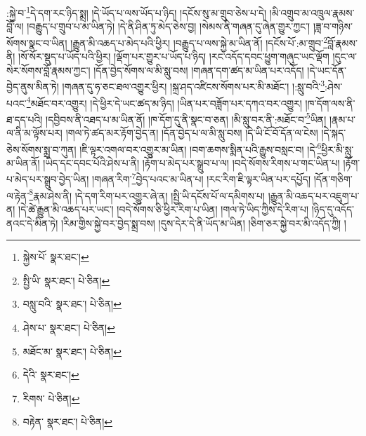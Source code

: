 :སྐྱེ་བ་\footnote{སྐྱེས་པོ་  སྣར་ཐང་། }དེ་དག་རང་ཉིད་སྨྲ། །དེ་ཡོད་པ་ལས་ཡོད་པ་ཉིད། །དངོས་སུ་མ་གྲུབ་ཅེས་པ་དེ། །མི་འགྲུབ་མ་འཁྲུལ་རྣམས་བློ་ལ། །བརྒྱུད་པ་གྲུབ་པ་མ་ཡིན་ཏེ། །དེ་ནི་ཤིན་ཏུ་མེད་ཅེས་བྱ། །སེམས་ནི་གཞན་དུ་ཞེན་གྱུར་ཀྱང་། །ཟླ་བ་གཉིས་སོགས་སྣང་བ་ཡིན། །རྒྱུན་མི་འཆད་པ་མེད་པའི་ཕྱིར། །བརྒྱུད་པ་ལས་སྐྱེ་མ་ཡིན་ནོ། །དངོས་པོ་:མ་གྲུབ་\footnote{སྤྱི་ཡི་  སྣར་ཐང་།  པེ་ཅིན། }བློ་རྣམས་ནི། །སོ་སོར་སྡུད་པ་ཡོད་པའི་ཕྱིར། །ལྡོག་པར་གྱུར་པ་ཡོད་པ་ཉིད། །རང་འདོད་དབང་ཕྱུག་གཞུང་ཡང་ལྡོག །དུང་ལ་སེར་སོགས་བློ་རྣམས་ཀྱང་། །དོན་བྱེད་སོགས་ལ་མི་སླུ་བས། །གཞན་དག་ཚད་མ་ཡིན་པར་འདོད། །དེ་ཡང་དོན་བྱེད་ནུས་མིན་ཏེ། །གཞན་དུ་ཧ་ཅང་ཐལ་འགྱུར་ཕྱིར། །སྐྲ་ཤད་འཛིངས་སོགས་པར་མི་མཐོང་། །:སླུ་བའི་\footnote{བསླུ་བའི་  སྣར་ཐང་།  པེ་ཅིན། }:ཤེས་པའང་\footnote{ཤེས་པ་  སྣར་ཐང་།  པེ་ཅིན། }མཐོང་བར་འགྱུར། །དེ་ཕྱིར་དེ་ཡང་ཚད་མ་ཉིད། །ཡིན་པར་བཟློག་པར་དཀའ་བར་འགྱུར། །ཁ་དོག་ལས་ནི་ཐ་དད་པའི། །དབྱིབས་ནི་འཐད་པ་མ་ཡིན་ནོ། །ཁ་དོག་དུ་ནི་སྣང་བ་ཅན། །མི་སླུ་བར་ནི་:མཐོང་བ་\footnote{མཐོང་མ་  སྣར་ཐང་།  པེ་ཅིན། }ཡིན། །རྣམ་པ་ལ་ནི་མ་ལྟོས་པར། །གལ་ཏེ་ཚད་མར་རྟོག་བྱེད་ན། །དོན་བྱེད་པ་ལ་མི་སླུ་བས། །དེ་ཡི་ངོ་བོ་དོན་ལ་ངེས། །དེ་སྐད་ཅེས་སོགས་སྨྲ་བ་ཀུན། །ཇི་ལྟར་འགལ་བར་འགྱུར་མ་ཡིན། །བག་ཆགས་སྨིན་པའི་རྒྱུས་བསླང་བ། །དེ་\footnote{དེའི་  སྣར་ཐང་། }ཕྱིར་མི་སླུ་མ་ཡིན་ནོ། །ཡིད་དང་དབང་པོའི་ཤེས་པ་ནི། །རྟོག་པ་མེད་པར་སྒྲུབ་པ་ལ། །བདེ་སོགས་རིགས་པ་གང་ཡིན་པ། །རྟོག་པ་མེད་པར་སྒྲུབ་བྱེད་ཡིན། །གཞན་རིག་\footnote{རིགས་  པེ་ཅིན། }བྱེད་པའང་མ་ཡིན་པ། །རང་རིག་ཇི་ལྟར་ཡིན་པར་དཔྱོད། །དོན་གཅིག་ལ་རྟེན་\footnote{བརྟེན་  སྣར་ཐང་།  པེ་ཅིན། }རྣམ་ཤེས་ནི། །དེ་དག་རིག་པར་འགྱུར་ཞེ་ན། །སྤྱི་ཡི་དངོས་པོ་ལ་དམིགས་པ། །རྒྱུན་མི་འཆད་པར་འཇུག་པ་ན། །དེ་ཚེ་རྒྱུན་མི་འཆད་པར་ཡང་། །བདེ་སོགས་ཅི་ཕྱིར་རིག་པ་ཡིན། །གལ་ཏེ་ཡིད་ཀྱིས་དེ་རིག་པ། །ཉིད་དུ་འདོད་ནའང་དེ་མིན་ཏེ། །རིམ་གྱིས་སྐྱེ་བར་བྱེད་སྨྲ་བས། །དུས་དེར་དེ་ནི་ཡོད་མ་ཡིན། །ཅིག་ཅར་སྐྱེ་བར་མི་འདོད་ཀྱི། །

